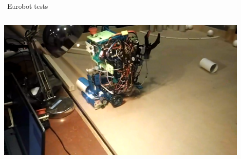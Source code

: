 \documentclass{beamer}
\begin{document}
\begin{frame}{\quad \quad ~Eurobot tests}
\begin{columns}
\begin{column}{0.49\textwidth}
\vskip 1cm
\includegraphics[width = 0.95\textwidth]{Pictures/4}
\end{column}
\end{columns}
\end{frame}
\end{document}
